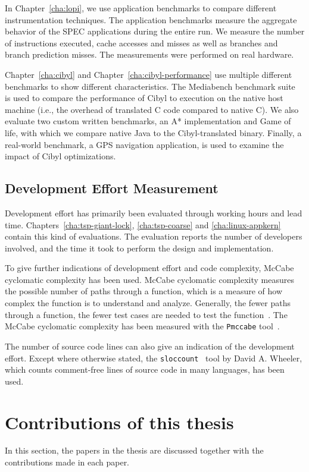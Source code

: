 In Chapter~\ref{cha:lopi}, we use application benchmarks to compare different
instrumentation techniques. The application benchmarks measure the aggregate
behavior of the SPEC applications during the entire run. We measure the number
of instructions executed, cache accesses and misses as well as branches and
branch prediction misses. The measurements were performed on real hardware.

Chapter~\ref{cha:cibyl} and Chapter~\ref{cha:cibyl-performance} use multiple
different benchmarks to show different characteristics. The Mediabench
benchmark suite~\cite{lee97mediabench} is used to compare the performance of
Cibyl to execution on the native host machine (i.e., the overhead of
translated C code compared to native C). We also evaluate two custom written
benchmarks, an A* implementation and Game of life, with which we compare
native Java to the Cibyl-translated binary. Finally, a real-world benchmark, a
GPS navigation application, is used to examine the impact of Cibyl
optimizations.

\subsection{Development Effort Measurement}
Development effort has primarily been evaluated through working hours and lead
time. Chapters~\ref{cha:tsp-giant-lock}, \ref{cha:tsp-coarse} and
\ref{cha:linux-appkern} contain this kind of evaluations. The evaluation
reports the number of developers involved, and the time it took to perform the
design and implementation.

To give further indications of development effort and code complexity, McCabe
cyclomatic complexity has been used.  McCabe cyclomatic complexity measures
the possible number of paths through a function, which is a measure of how
complex the function is to understand and analyze. Generally, the fewer paths
through a function, the fewer test cases are needed to test the
function~\cite{fenton98swmetrics}. The McCabe cyclomatic complexity has been
measured with the \texttt{Pmccabe} tool~\cite{pmccabe}.

The number of source code lines can also give an indication of the development
effort. Except where otherwise stated, the \texttt{sloccount}~\cite{sloccount}
tool by David A. Wheeler, which counts comment-free lines of source code in
many languages, has been used.


\section{Contributions of this thesis}
\label{sec:intro:contributions}
In this section, the papers in the thesis are discussed together with the
contributions made in each paper.

